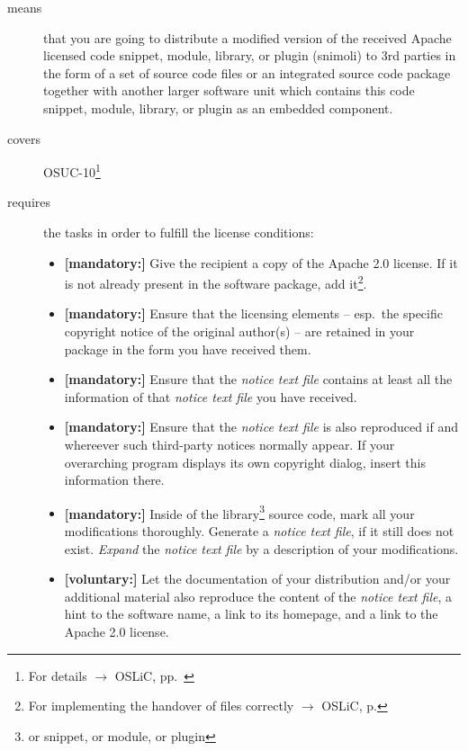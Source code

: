 \begin{description}
\item[means] that you are going to distribute a modified version of the received
Apache licensed code snippet, module, library, or plugin (snimoli) to 3rd
parties in the form of a set of source code files or an integrated source code
package together with another larger software unit which contains this code
snippet, module, library, or plugin as an embedded component.
\item[covers] OSUC-10\footnote{For details $\rightarrow$ OSLiC, pp.\ \pageref{OSUC-10-DEF}}
\item[requires] the tasks in order to fulfill the license conditions:
\begin{itemize}
  
  \item \textbf{[mandatory:]} Give the recipient a copy of the Apache 2.0
  license. If it is not already present in the software package, add
  it\footnote{For implementing the handover of files correctly $\rightarrow$
  OSLiC, p. \pageref{DistributingFilesHint}}.

  \item \textbf{[mandatory:]} Ensure that the licensing elements -- esp.\ the
  specific copyright notice of the original author(s) -- are retained in your
  package in the form you have received them.
  
  \item \textbf{[mandatory:]} Ensure that the \emph{notice text file} contains at least
  all the information of that \emph{notice text file} you have received.
 
  \item \textbf{[mandatory:]} Ensure that the \emph{notice text file} is also
  reproduced if and whereever such third-party notices normally appear. If your
  overarching program displays its own copyright dialog, insert this information
  there.
 
  \item \textbf{[mandatory:]} Inside of the library\footnote{or snippet, or
  module, or plugin} source code, mark all your modifications thoroughly.
  Generate a \emph{notice text file}, if it still does not exist. \emph{Expand}
  the \emph{notice text file} by a description of your modifications.
  
  \item \textbf{[voluntary:]} Let the documentation of your distribution and/or
  your additional material also reproduce the content of the \emph{notice text
  file}, a hint to the software name, a link to its homepage, and a link to the
  Apache 2.0 license.


\end{itemize}
\end{description}
